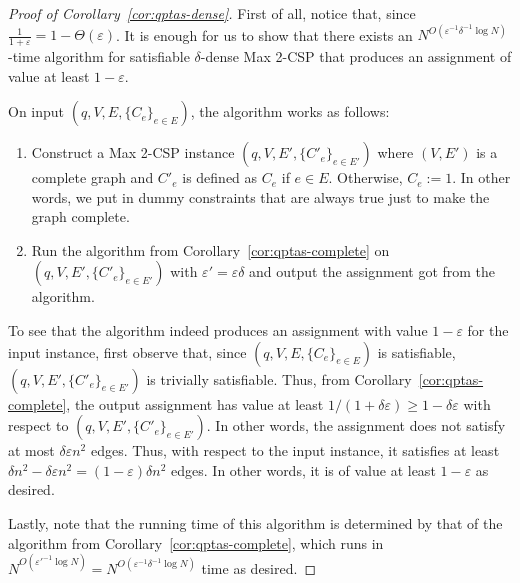 \documentclass{article}
\begin{document}
\begin{proof}[Proof of Corollary~\ref{cor:qptas-dense}]
  First of all, notice that, since $\frac{1}{1 + \varepsilon} = 1 - \Theta(\varepsilon)$. It is enough for us to show that there exists an $N^{O(\varepsilon^{-1}\delta^{-1}\log N)}$-time algorithm for satisfiable $\delta$-dense {\sc Max 2-CSP} that produces an assignment of value at least $1 - \varepsilon$.

  On input $(q, V, E, \{C_e\}_{e \in E})$, the algorithm works as follows:
  \begin{enumerate}
    \item Construct a {\sc Max 2-CSP} instance $(q, V, E', \{C'_e\}_{e \in E'})$ where $(V, E')$ is a complete graph and $C'_e$ is defined as $C_e$ if $e \in E$. Otherwise, $C_e := 1$. In other words, we put in dummy constraints that are always true just to make the graph complete.
    \item Run the algorithm from Corollary~\ref{cor:qptas-complete} on $(q, V, E', \{C'_e\}_{e \in E'})$ with $\varepsilon' = \varepsilon \delta$ and output the assignment got from the algorithm.
  \end{enumerate}

  To see that the algorithm indeed produces an assignment with value $1 - \varepsilon$ for the input instance, first observe that, since $(q, V, E, \{C_e\}_{e \in E})$ is satisfiable,  $(q, V, E', \{C'_e\}_{e \in E'})$ is trivially satisfiable. Thus, from Corollary~\ref{cor:qptas-complete}, the output assignment has value at least $1/(1 + \delta\varepsilon) \geq 1 - \delta \varepsilon$ with respect to $(q, V, E', \{C'_e\}_{e \in E'})$. In other words, the assignment does not satisfy at most $\delta \varepsilon n^2$ edges. Thus, with respect to the input instance, it satisfies at least $\delta n^2 - \delta \varepsilon n^2 = (1 - \varepsilon) \delta n^2$ edges. In other words, it is of value at least $1 - \varepsilon$ as desired.

  Lastly, note that the running time of this algorithm is determined by that of the algorithm from Corollary~\ref{cor:qptas-complete}, which runs in $N^{O(\varepsilon'^{-1}\log N)} = N^{O(\varepsilon^{-1}\delta^{-1}\log N)}$ time as desired.
\end{proof}
\end{document}
